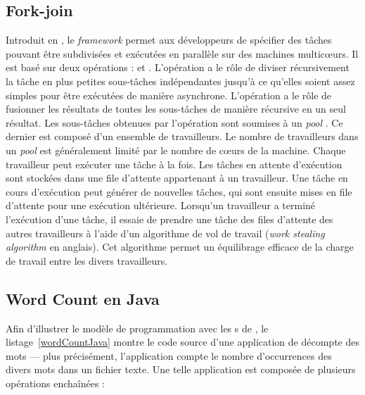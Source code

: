 \subsection{Fork-join}

Introduit en , le \emph{framework}  permet aux d\'eveloppeurs de sp\'ecifier des t\^aches pouvant \^etre subdivis\'ees et ex\'ecut\'ees en parall\`ele sur des machines multicœurs. Il est bas\'e sur deux op\'erations :  et . L'op\'eration  a le r\^ole de diviser r\'ecursivement la t\^ache en plus petites sous-t\^aches ind\'ependantes jusqu'\`a ce qu'elles soient assez simples pour \^etre ex\'ecut\'ees de mani\`ere asynchrone. L'op\'eration  a le r\^ole de fusionner les r\'esultats de toutes les sous-t\^aches de mani\`ere r\'ecursive en un seul r\'esultat.
Les sous-t\^aches obtenues par l'op\'eration  sont soumises \`a un \emph{pool} . Ce dernier est composé d'un ensemble de travailleurs. Le nombre de travailleurs dans un \emph{pool}  est g\'en\'eralement limit\'e par le nombre de cœurs de la machine. Chaque travailleur peut ex\'ecuter une t\^ache \`a la fois. Les t\^aches en attente d'ex\'ecution sont stock\'ees dans une file d'attente appartenant \`a un travailleur. Une t\^ache en cours d'ex\'ecution peut g\'en\'erer de nouvelles t\^aches, qui sont ensuite mises en file d'attente pour une ex\'ecution ult\'erieure. Lorsqu'un travailleur a termin\'e l'ex\'ecution d'une t\^ache, il essaie de prendre une t\^ache des files d'attente des autres travailleurs \`a l'aide d'un algorithme de vol de travail (\emph{work stealing algorithm} en anglais). Cet algorithme permet un \'equilibrage efficace de la charge de travail entre les divers travailleurs.


\subsection{Word Count en Java}

Afin d'illustrer le mod\`ele de programmation avec les s de , le listage~\ref{wordCountJava} montre le code source d'une application de d\'ecompte des mots --- plus pr\'ecis\'ement, l'application compte le nombre d'occurrences des divers mots dans un fichier texte. Une telle application est compos\'ee de plusieurs op\'erations encha\^in\'ees :


